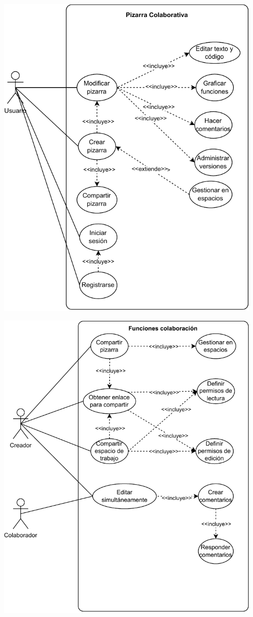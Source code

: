 \documentclass[a4paper, oneside, final]{scrartcl}
\begin{document}
\includegraphics[width=\textwidth]{images/Casos-de-uso-1.pdf}

\includegraphics[width=\textwidth]{images/Casos-de-uso-2.pdf}
\end{document}
